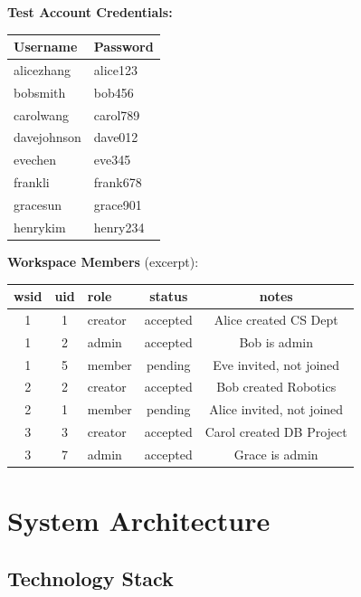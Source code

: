 \documentclass[11pt]{article}
\begin{document}
\noindent\textbf{Test Account Credentials:}
\begin{center}
\small
\begin{tabular}{ll}
\toprule
Username & Password \\
\midrule
alicezhang & alice123 \\
bobsmith & bob456 \\
carolwang & carol789 \\
davejohnson & dave012 \\
evechen & eve345 \\
frankli & frank678 \\
gracesun & grace901 \\
henrykim & henry234 \\
\bottomrule
\end{tabular}
\end{center}

\noindent\textbf{Workspace Members} (excerpt):
\begin{center}
\tiny
\begin{tabular}{cclcc}
\toprule
wsid & uid & role & status & notes \\
\midrule
1 & 1 & creator & accepted & Alice created CS Dept \\
1 & 2 & admin & accepted & Bob is admin \\
1 & 5 & member & pending & Eve invited, not joined \\
2 & 2 & creator & accepted & Bob created Robotics \\
2 & 1 & member & pending & Alice invited, not joined \\
3 & 3 & creator & accepted & Carol created DB Project \\
3 & 7 & admin & accepted & Grace is admin \\
\bottomrule
\end{tabular}
\end{center}



\newpage
\section{System Architecture}
\label{sec:arch}

\subsection{Technology Stack}
\end{document}
